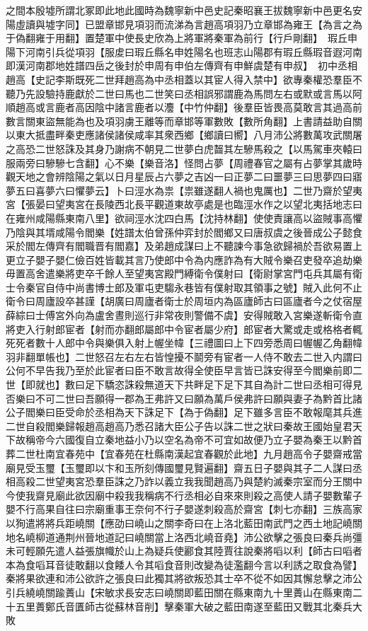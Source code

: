 之間本殷墟所謂北冢即此地此國時為魏寧新中邑史記秦昭襄王拔魏寧新中邑更名安陽虛讀與墟字同】已盟章邯見項羽而流涕為言趙高項羽乃立章邯為雍王【為言之為于偽翻雍于用翻】置楚軍中使長史欣為上將軍將秦軍為前行【行戶剛翻】　瑕丘申陽下河南引兵從項羽【服䖍曰瑕丘縣名申姓陽名也班志山陽郡有瑕丘縣瑕音遐河南即漢河南郡地姓譜四岳之後封於申周有申伯左傳齊有申鮮虞楚有申叔】　初中丞相趙高【史記李斯既死二世拜趙高為中丞相蓋以其宦人得入禁中】欲專秦權恐羣臣不聽乃先設驗持鹿獻於二世曰馬也二世笑曰丞相誤邪謂鹿為馬問左右或默或言馬以阿順趙高或言鹿者高因陰中諸言鹿者以灋【中竹仲翻】後羣臣皆畏高莫敢言其過高前數言關東盜無能為也及項羽虜王離等而章邯等軍數敗【數所角翻】上書請益助自關以東大抵盡畔秦吏應諸侯諸侯咸率其衆西鄉【鄉讀曰嚮】八月沛公將數萬攻武關屠之高恐二世怒誅及其身乃謝病不朝見二世夢白虎齧其左驂馬殺之【以馬駕車夾轅曰服兩旁曰驂驂七含翻】心不樂【樂音洛】怪問占夢【周禮春官之屬有占夢掌其歲時觀天地之會辨陰陽之氣以日月星辰占六夢之吉凶一曰正夢二曰噩夢三曰思夢四曰寤夢五曰喜夢六曰懼夢云】卜曰涇水為祟【祟雖遂翻人禍也鬼厲也】二世乃齋於望夷宮【張晏曰望夷宮在長陵西北長平觀道東故亭處是也臨涇水作之以望北夷括地志曰在雍州咸陽縣東南八里】欲祠涇水沈四白馬【沈持林翻】使使責讓高以盜賊事高懼乃陰與其壻咸陽令閻樂【姓譜太伯曾孫仲弈封於閻鄉又曰唐叔虞之後晉成公子懿食采於閻左傳齊有閻職晋有閻嘉】及弟趙成謀曰上不聽諫今事急欲歸禍於吾欲易置上更立子嬰子嬰仁儉百姓皆載其言乃使郎中令為内應詐為有大賊令樂召吏發卒追劫樂毋置高舍遣樂將吏卒千餘人至望夷宮殿門縛衛令僕射曰【衛尉掌宮門屯兵其屬有衛士令秦官自侍中尚書博士郎及軍屯吏騶永巷皆有僕射取其領事之號】賊入此何不止衛令曰周廬設卒甚謹【胡廣曰周廬者衛士於周垣内為區廬師古曰區廬者今之仗宿屋薛綜曰士傅宮外向為盧舍晝則巡行非常夜則警備不虞】安得賊敢入宮樂遂斬衛令直將吏入行射郎宦者【射而亦翻郎屬郎中令宦者屬少府】郎宦者大驚或走或格格者輒死死者數十人郎中令與樂俱入射上幄坐幃【三禮圖曰上下四旁悉周曰幄幄乙角翻幃羽非翻單帳也】二世怒召左右左右皆惶擾不鬬旁有宦者一人侍不敢去二世入内謂曰公何不早告我乃至於此宦者曰臣不敢言故得全使臣早言皆已誅安得至今閻樂前即二世【即就也】數曰足下驕恣誅殺無道天下共畔足下足下其自為計二世曰丞相可得見否樂曰不可二世曰吾願得一郡為王弗許又曰願為萬戶侯弗許曰願與妻子為黔首比諸公子閻樂曰臣受命於丞相為天下誅足下【為于偽翻】足下雖多言臣不敢報麾其兵進二世自殺閻樂歸報趙高趙高乃悉召諸大臣公子告以誅二世之狀曰秦故王國始皇君天下故稱帝今六國復自立秦地益小乃以空名為帝不可宜如故便乃立子嬰為秦王以黔首葬二世杜南宜春苑中【宜春苑在杜縣南漢起宜春觀於此地】九月趙高令子嬰齋戒當廟見受玉璽【玉璽即以卞和玉所刻傳國璽見賢遍翻】齋五日子嬰與其子二人謀曰丞相高殺二世望夷宮恐羣臣誅之乃詐以義立我我聞趙高乃與楚約滅秦宗室而分王關中今使我齋見廟此欲因廟中殺我我稱病不行丞相必自來來則殺之高使人請子嬰數輩子嬰不行高果自往曰宗廟重事王奈何不行子嬰遂刺殺高於齋宮【刺七亦翻】三族高家以狥遣將將兵距嶢關【應劭曰嶢山之關李奇曰在上洛北藍田南武門之西土地記嶢關地名嶢柳道通荆州晉地道記曰嶢關當上洛西北嶢音堯】沛公欲擊之張良曰秦兵尚彊未可輕願先遣人益張旗幟於山上為疑兵使酈食其陸賈往說秦將㗖以利【師古曰㗖者本為食㗖耳音徒敢翻以食餧人令其㗖食音則改變為徒濫翻今言以利誘之取食為譬】秦將果欲連和沛公欲許之張良曰此獨其將欲叛恐其士卒不從不如因其懈怠擊之沛公引兵繞嶢關踰蕢山【宋敏求長安志曰嶢關即藍田關在縣東南九十里蕢山在縣東南二十五里蕢鄭氏音匱師古從蘇林音削】擊秦軍大破之藍田南遂至藍田又戰其北秦兵大敗

